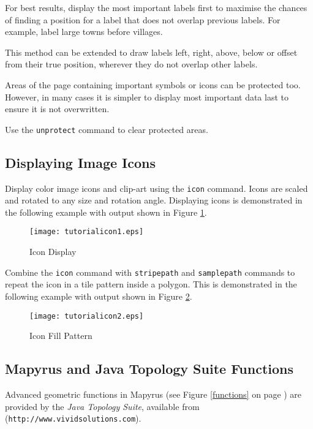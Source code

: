 For best results, display the most important labels first to maximise the
chances of finding a position for a label that does not overlap previous
labels.  For example, label large towns before villages.

This method can be extended to draw labels left, right, above, below or offset
from their true position, wherever they do not overlap other labels.

Areas of the page containing important symbols or icons can be
protected too.  However, in many cases it is simpler to
display most important data last to ensure it is not overwritten.

Use the \texttt{unprotect} command to clear protected areas.

\subsection{Displaying Image Icons}
\label{icons}

Display color image icons and clip-art using the \texttt{icon} command.
Icons are scaled and rotated to any size and rotation angle.
Displaying icons is demonstrated in the following example
with output shown in Figure \ref{tutorialicon1}.



\begin{figure}[htb]
\texttt{[image: tutorialicon1.eps]}
\caption{Icon Display}
\label{tutorialicon1}
\end{figure}

Combine the \texttt{icon} command with
\texttt{stripepath} and
\texttt{samplepath} commands to
repeat the icon in a tile pattern inside a polygon.
This is demonstrated in the following example
with output shown in Figure \ref{tutorialicon2}.



\begin{figure}[htb]
\texttt{[image: tutorialicon2.eps]}
\caption{Icon Fill Pattern}
\label{tutorialicon2}
\end{figure}

\subsection{Mapyrus and Java Topology Suite Functions}
\label{tutorialjts}

Advanced geometric functions in Mapyrus
(see Figure \ref{functions} on page \pageref{functions})
are provided by the
\textit{Java Topology Suite},
available from
(\texttt{http://www.vividsolutions.com}).

